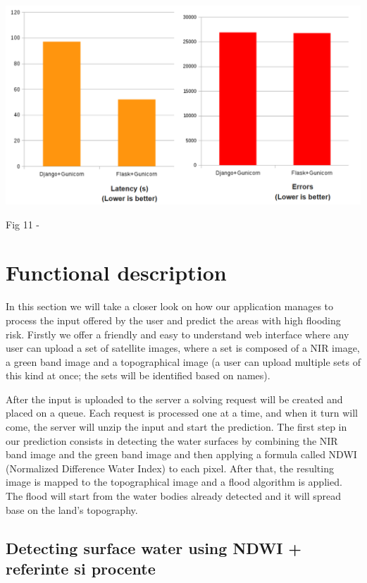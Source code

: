 \documentclass[12pt, a4paper]{report}
\begin{document}
\medskip
\includegraphics[scale=0.6, center]{django-flask-latency.png}
\begin{center}
Fig 11 - \cite{Flask2}
\end{center}




\section{Functional description}

\quad
In this section we will take a closer look on how our application manages to process the input offered by the user and predict the areas with high flooding risk. Firstly we offer a friendly and easy to understand web interface where any user can upload a set of satellite images, where a set is composed of a NIR image, a green band image and a topographical image (a user can upload multiple sets of this kind at once; the sets will be identified based on names).
\par 
 After the input is uploaded to the server a solving request will be created and placed on a queue. Each request is processed one at a time, and when it turn will come, the server will unzip the input and start the prediction. The first step in our prediction consists in detecting the water surfaces by combining the NIR band image and the green band image and then applying a formula called NDWI (Normalized Difference Water Index) to each pixel. After that, the resulting image is mapped to the topographical image and a flood algorithm is applied. The flood will start from the water bodies already detected and it will spread base on the land's topography.


\subsection{Detecting surface water using NDWI + referinte si procente}
\quad 
\end{document}
